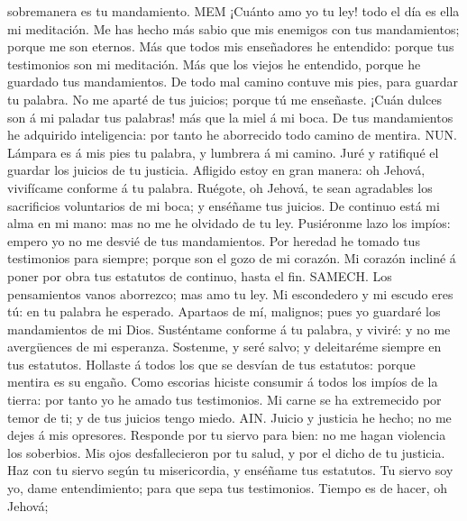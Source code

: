 sobremanera es tu mandamiento.  MEM ¡Cuánto amo yo tu ley!
todo el día es ella mi meditación.  Me has hecho más sabio
que mis enemigos con tus mandamientos; porque me son eternos.
 Más que todos mis enseñadores he entendido: porque tus
testimonios son mi meditación.  Más que los viejos he
entendido, porque he guardado tus mandamientos.  De todo
mal camino contuve mis pies, para guardar tu palabra.  No
me aparté de tus juicios; porque tú me enseñaste.  ¡Cuán
dulces son á mi paladar tus palabras! más que la miel á mi boca.
 De tus mandamientos he adquirido inteligencia: por tanto
he aborrecido todo camino de mentira.  NUN. Lámpara es á
mis pies tu palabra, y lumbrera á mi camino.  Juré y
ratifiqué el guardar los juicios de tu justicia.  Afligido
estoy en gran manera: oh Jehová, vivifícame conforme á tu palabra.
 Ruégote, oh Jehová, te sean agradables los sacrificios
voluntarios de mi boca; y enséñame tus juicios.  De
continuo está mi alma en mi mano: mas no me he olvidado de tu ley.
 Pusiéronme lazo los impíos: empero yo no me desvié de tus
mandamientos.  Por heredad he tomado tus testimonios para
siempre; porque son el gozo de mi corazón.  Mi corazón
incliné á poner por obra tus estatutos de continuo, hasta el fin.
 SAMECH. Los pensamientos vanos aborrezco; mas amo tu ley.
 Mi escondedero y mi escudo eres tú: en tu palabra he
esperado.  Apartaos de mí, malignos; pues yo guardaré los
mandamientos de mi Dios.  Susténtame conforme á tu
palabra, y viviré: y no me avergüences de mi esperanza. 
Sostenme, y seré salvo; y deleitaréme siempre en tus estatutos.
 Hollaste á todos los que se desvían de tus estatutos:
porque mentira es su engaño.  Como escorias hiciste
consumir á todos los impíos de la tierra: por tanto yo he amado tus
testimonios.  Mi carne se ha extremecido por temor de ti;
y de tus juicios tengo miedo.  AIN. Juicio y justicia he
hecho; no me dejes á mis opresores.  Responde por tu
siervo para bien: no me hagan violencia los soberbios. 
Mis ojos desfallecieron por tu salud, y por el dicho de tu justicia.
 Haz con tu siervo según tu misericordia, y enséñame tus
estatutos.  Tu siervo soy yo, dame entendimiento; para que
sepa tus testimonios.  Tiempo es de hacer, oh Jehová;
